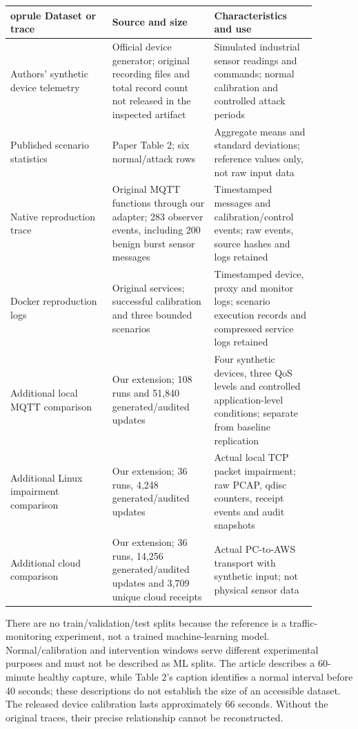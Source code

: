 \documentclass[11pt,a4paper]{article}
\begin{document}
\begingroup\small\setlength{\tabcolsep}{3pt}\begin{longtable}{p{0.29333333333333333\linewidth}p{0.29333333333333333\linewidth}p{0.29333333333333333\linewidth}}	oprule
Dataset or trace & Source and size & Characteristics and use \\
\midrule\endhead
Authors' synthetic device telemetry & Official device generator; original recording files and total record count not released in the inspected artifact & Simulated industrial sensor readings and commands; normal calibration and controlled attack periods \\
Published scenario statistics & Paper Table 2; six normal/attack rows & Aggregate means and standard deviations; reference values only, not raw input data \\
Native reproduction trace & Original MQTT functions through our adapter; 283 observer events, including 200 benign burst sensor messages & Timestamped messages and calibration/control events; raw events, source hashes and logs retained \\
Docker reproduction logs & Original services; successful calibration and three bounded scenarios & Timestamped device, proxy and monitor logs; scenario execution records and compressed service logs retained \\
Additional local MQTT comparison & Our extension; 108 runs and 51,840 generated/audited updates & Four synthetic devices, three QoS levels and controlled application-level conditions; separate from baseline replication \\
Additional Linux impairment comparison & Our extension; 36 runs, 4,248 generated/audited updates & Actual local TCP packet impairment; raw PCAP, qdisc counters, receipt events and audit snapshots \\
Additional cloud comparison & Our extension; 36 runs, 14,256 generated/audited updates and 3,709 unique cloud receipts & Actual PC-to-AWS transport with synthetic input; not physical sensor data \\
\bottomrule\end{longtable}\endgroup

There are no train/validation/test splits because the reference is a traffic-monitoring experiment, not a trained machine-learning model. Normal/calibration and intervention windows serve different experimental purposes and must not be described as ML splits. The article describes a 60-minute healthy capture, while Table 2's caption identifies a normal interval before 40 seconds; these descriptions do not establish the size of an accessible dataset. The released device calibration lasts approximately 66 seconds. Without the original traces, their precise relationship cannot be reconstructed.
\end{document}
